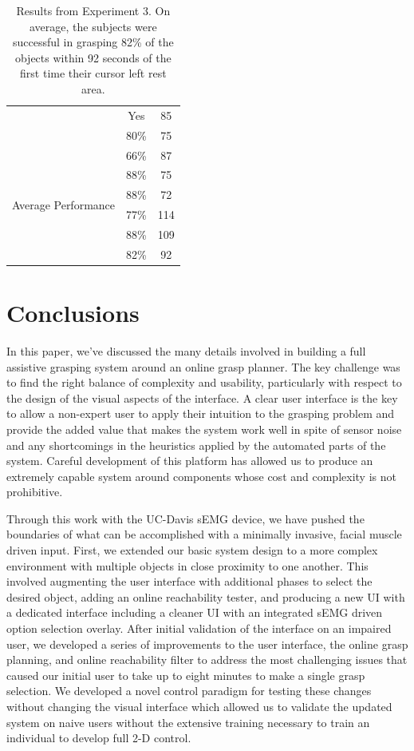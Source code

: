 \begin{table}[t]
\begin{minipage}[!t]{.4\columnwidth}
\begin{tabular}[t!]{ | c c c | }
& Yes & 85 \\ 
& 80\% & 75\\\hline 
\multirow{6}{*}{\begin{minipage}[t]{0.2\columnwidth}Average Performance\end{minipage}} & 66\% & 87 \\
& 88\% & 75 \\
& 88\% & 72 \\
& 77\% & 114 \\
& 88\% &  109\\ 
& 82\% & 92\\\hline 
\end{tabular}
\end{minipage}
\caption{Results from Experiment 3. On average, the subjects were successful in grasping 82\% of the objects within 92 seconds of the first time their cursor left rest area.}
\label{tab:results_3}
\end{table}

\section{Conclusions}
In this paper, we've discussed the many details involved in building a full assistive grasping system around an online grasp planner. The key challenge was to find the right balance of complexity and usability, particularly with respect to the design of the visual aspects of the interface. A clear user interface is the key to allow a non-expert user to apply their intuition to the grasping problem and provide the added value that makes the system work well in spite of sensor noise and any shortcomings in the heuristics applied by the automated parts of the system. Careful development of this platform has allowed us to produce an extremely capable system around components whose cost and complexity is not prohibitive. 

Through this work with the UC-Davis sEMG device, we have pushed the boundaries of what can be accomplished with a minimally invasive, facial muscle driven input. First, we extended our basic system design to a more complex environment with multiple objects in close proximity to one another. This involved augmenting the user interface with additional phases to select the desired object, adding an online reachability tester, and producing a new UI with a dedicated interface including a cleaner UI with an integrated sEMG driven option selection overlay. After initial validation of the interface on an impaired user, we developed a series of improvements to the user interface, the online grasp planning, and online reachability filter to address the most challenging issues that caused our initial user to take up to eight minutes to make a single grasp selection. We developed a novel control paradigm for testing these changes without changing the visual interface which allowed us to validate the updated system on naive users without the extensive training necessary to train an individual to develop full 2-D control. 

